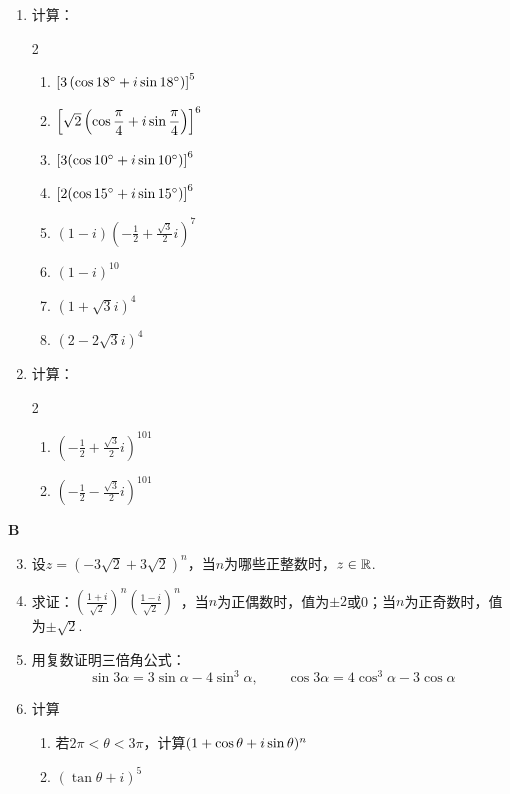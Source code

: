 \begin{enumerate}
    \item 计算：
\begin{multicols}{2}
\begin{enumerate}[(1)]
    \item $\left[3\left(\cos18^{\circ}+i\sin18^{\circ}\right)\right]^5$
    \item $\left[\sqrt{2}\left(\cos\dfrac{\pi}{4}+i\sin\dfrac{\pi}{4}\right)\right]^6$
    \item $\left[3(\cos10^{\circ}+i\sin10^{\circ})\right]^6$
    \item $\left[2(\cos15^{\circ}+i\sin15^{\circ})\right]^6$
    \item $(1-i)\left(-\frac{1}{2}+\frac{\sqrt{3}}{2}i\right)^7$
    \item $(1-i)^{10}$
    \item $\left(1+\sqrt{3}i\right)^4$
    \item $\left(2-2\sqrt{3}i\right)^4$
\end{enumerate}
\end{multicols}
    \item 计算：
\begin{multicols}{2}
\begin{enumerate}[(1)]
    \item $\left(-\frac{1}{2}+\frac{\sqrt{3}}{2}i\right)^{101}$
    \item $\left(-\frac{1}{2}-\frac{\sqrt{3}}{2}i\right)^{101}$
\end{enumerate}
\end{multicols}
\end{enumerate}

\begin{center}
    \bfseries B
\end{center}
\begin{enumerate}\setcounter{enumi}{2}
    \item 设$z=\left(-3\sqrt{2}+3\sqrt{2}\right)^n$，当$n$为哪些正整数时，$z\in\mathbb{R}$.
    \item 求证：$\left(\frac{1+i}{\sqrt{2}}\right)^n\left(\frac{1-i}{\sqrt{2}}\right)^n$，当$n$为正偶数时，值为$\pm 2$或0；当$n$为正奇数时，值为$\pm\sqrt{2}$.
    \item 用复数证明三倍角公式：
\[\sin3\alpha=3\sin\alpha-4\sin^3\alpha,\qquad \cos3\alpha=4\cos^3\alpha-3\cos\alpha\]
\item 计算 
\begin{enumerate}[(1)]
    \item 若$2\pi<\theta<3\pi$，计算$(1+\cos\theta+i\sin\theta)^n$
    \item $(\tan\theta+i)^5$
\end{enumerate}
\end{enumerate}

